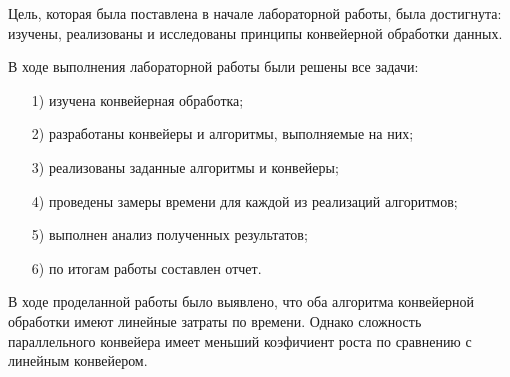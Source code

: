 Цель, которая была поставлена в начале лабораторной работы, была достигнута: изучены, реализованы и исследованы принципы конвейерной обработки данных.

В ходе выполнения лабораторной работы были решены все задачи:
\begin{enumerate}
	\item[1)] изучена конвейерная обработка;
	\item[2)] разработаны конвейеры и алгоритмы, выполняемые на них;
	\item[3)] реализованы заданные алгоритмы и конвейеры;
	\item[4)] проведены замеры времени для каждой из реализаций алгоритмов;
	\item[5)] выполнен анализ полученных результатов;
	\item[6)] по итогам работы составлен отчет.
\end{enumerate}

В ходе проделанной работы было выявлено, что оба алгоритма конвейерной обработки имеют линейные затраты по времени. Однако сложность параллельного конвейера имеет меньший коэфичиент роста по сравнению с линейным конвейером.